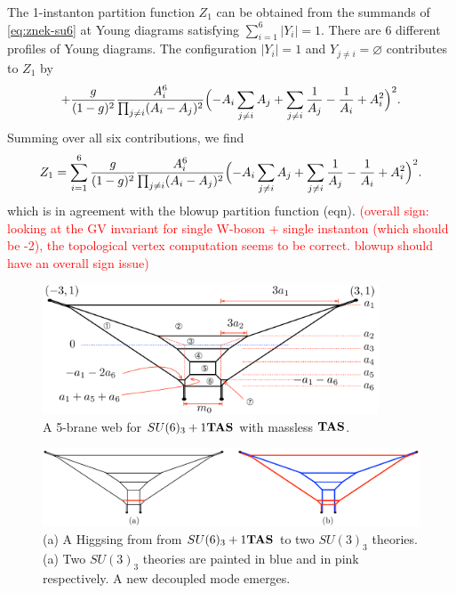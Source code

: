 \documentclass[letterpaper, 11pt]{article}
\begin{document}
The 1-instanton partition function $Z_1$ can be obtained from the summands of \eqref{eq:znek-su6} at Young diagrams satisfying $\sum_{i=1}^6 |Y_i|=1$. There are 6 different profiles of Young diagrams. The configuration $|Y_i| = 1$ and $Y_{j\neq i} = \varnothing$ contributes to $Z_{1}$ by
\begin{align}
  + \frac{g}{(1-g)^2} \frac{A_i^6}{\prod_{j \neq i} (A_i - A_j)^2} 
  \Bigl(-A_i \sum_{j\neq i} A_j +  \sum_{j\neq i}\frac{1}{A_j}  - \frac{1}{A_i} + A_i^2
 \Bigr)^2. 
\end{align}
Summing over all six contributions, we find
\begin{align}
  Z_1 = \sum_{i=1}^6 \frac{g}{(1-g)^2} \frac{A_i^6}{\prod_{j \neq i} (A_i - A_j)^2} 
  \Bigl(-A_i \sum_{j\neq i} A_j +  \sum_{j\neq i}\frac{1}{A_j}  - \frac{1}{A_i} + A_i^2
 \Bigr)^2. 
\end{align}
which is in agreement with the blowup partition function (eqn). \textcolor{red}{(overall sign: looking at the GV invariant for single W-boson + single instanton (which should be -2), the topological vertex computation seems to be correct. blowup should have an overall sign issue)}
\pagebreak

\begin{figure}[t]
\centering
\includegraphics[width=10cm]{SU6-monopole.pdf}
\caption{A 5-brane web for $SU(6)_3+1{\bf TAS}$ with massless ${\bf TAS}$.}
\label{fig:SU6-monopole}
\end{figure}

\begin{figure}[t]
\centering
\includegraphics[width=12cm]{SU6-Higgsing.pdf}
\caption{(a) A Higgsing from from $SU(6)_3+1{\bf TAS}$ to two $SU(3)_3$ theories. (a) Two $SU(3)_3$ theories are painted in blue and in pink respectively. A new decoupled mode emerges.}
\label{fig:SU6-Higgsing}
\end{figure}
\end{document}
